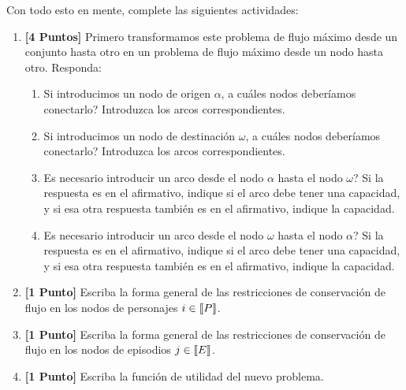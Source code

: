 \documentclass[ a4paper, twoside, 11pt]{article}
\begin{document}
\begin{problem}
Con todo esto en mente, complete las siguientes actividades: 
\begin{enumerate}[label=\textbf{\alph*)}]
\item \textbf{[4 Puntos]} Primero transformamos este problema de flujo m\'aximo desde un conjunto hasta otro en un problema de flujo m\'aximo desde un nodo hasta otro. Responda: 
\begin{enumerate}[label=\textbf{\roman*)}]
\item Si introducimos un nodo de origen $\alpha$, a cu\'ales nodos deber\'iamos conectarlo? Introduzca los arcos correspondientes. 
\item Si introducimos un nodo de destinaci\'on $\omega$, a cu\'ales nodos deber\'iamos conectarlo? Introduzca los arcos correspondientes. 
\item Es necesario introducir un arco desde el nodo $\alpha$ hasta el nodo $\omega$? Si la respuesta es en el afirmativo, indique si el arco debe tener una capacidad, y si esa otra respuesta tambi\'en es en el afirmativo, indique la capacidad. 
\item Es necesario introducir un arco desde el nodo $\omega$ hasta el nodo $\alpha$? Si la respuesta es en el afirmativo, indique si el arco debe tener una capacidad, y si esa otra respuesta tambi\'en es en el afirmativo, indique la capacidad. 
\end{enumerate}
\item \textbf{[1 Punto]} Escriba la forma general de las restricciones de conservaci\'on de flujo en los nodos de personajes $i \in \llbracket P \rrbracket$. 
\item \textbf{[1 Punto]} Escriba la forma general de las restricciones de conservaci\'on de flujo en los nodos de episodios $j \in \llbracket E \rrbracket$. 
\item \textbf{[1 Punto]} Escriba la funci\'on de utilidad del nuevo problema. 
\end{enumerate}

\end{problem}
\fullskip
\end{document}

